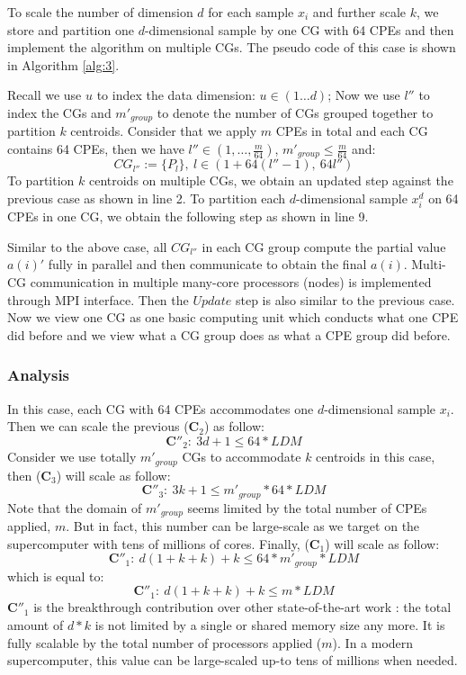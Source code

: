 \documentclass[10pt,journal,compsoc]{IEEEtran}
\begin{document}
To scale the number of dimension $d$ for each sample $x_i$ and further scale $k$, we store and partition one $d$-dimensional sample by one CG with 64 CPEs and then implement the algorithm on multiple CGs.  The pseudo code of this case is shown in Algorithm \ref{alg:3}.

Recall we use $u$ to index the data dimension: $u \in (1\ldots d)$; Now we use $l''$ to index the CGs and $m'_{group}$ to denote the number of CGs grouped together to partition $k$ centroids. Consider that  we apply $m$ CPEs in total and each CG contains 64 CPEs, then we have $l'' \in (1, \ldots,\frac{m}{64})$, $m'_{group} \leq \frac{m}{64}$ and:
$$CG_{l''} := \{P_l\},\ l \in (1+64(l''-1),\ 64l'') $$
To partition $k$ centroids on multiple CGs, we obtain an updated step against the previous case as shown in line 2.
To partition each $d$-dimensional sample $x^d_i$ on 64 CPEs in one CG, we obtain the following step as shown in line 9.

Similar to the above case, all $CG_{l''}$ in each CG group compute the partial value $a(i)'$ fully in parallel and then communicate to obtain the final $a(i)$.
Multi-CG communication in multiple many-core processors (nodes) is implemented through MPI interface. Then the $Update$ step is also similar to the previous case. Now we view one CG as one basic computing unit which conducts what one CPE did before and we view what a CG group does as what a CPE group did before.

\subsubsection*{Analysis} 
In this case, each CG with 64 CPEs accommodates one $d$-dimensional sample $x_i$. Then we can scale the previous ($\mathbf{C}_2$) as follow:
$$\mathbf{C''}_2:\ 3d+1 \leq 64 *LDM  $$
Consider we use totally $m'_{group}$ CGs to accommodate $k$ centroids in this case, then ($\mathbf{C}_3$) will scale as follow: 
$$\mathbf{C''}_3:\ 3k+1 \leq {m'}_{group} *64*LDM  $$
Note that the domain of $m'_{group}$ seems limited by the total number of CPEs applied, $m$. But in fact, this number can be large-scale as we target on the supercomputer with tens of millions of cores. Finally, ($\mathbf{C}_1$) will scale as follow:
$$\mathbf{C''}_1:\ d(1+k+k)+k \leq 64*m'_{group}*LDM  $$
which is equal to:
$$\mathbf{C''}_1:\ d(1+k+k)+k \leq m*LDM  $$
$\mathbf{C''}_1$ is the breakthrough contribution over other state-of-the-art work \cite{bender2015k}: the total amount of $d*k$ is not limited by a single or shared memory size any more. It is fully scalable by the total number of processors applied ($m$). In a modern supercomputer, this value can be large-scaled up-to tens of millions when needed.  
\end{document}
